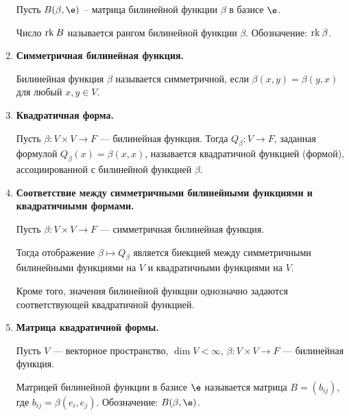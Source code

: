 \begin{enumerate}
Пусть $B(\beta, \e)$ -- матрица билинейной функции $\beta$ в базисе $\e$.

Число $\mathrm{rk}\: B$ называется рангом билинейной функции $\beta$. Обозначение: $\mathrm{rk}\: \beta$.
\item \textbf{Симметричная билинейная функция.}

Билинейная функция $\beta$ называется симметричной, если $\beta(x, y) =\beta(y, x)$ для любый $x, y \in V$.
\item \textbf{Квадратичная форма.}

Пусть $\beta \colon V\times V \rightarrow F$ --- билинейная функция. Тогда $Q_\beta \colon V \rightarrow F$, заданная формулой $Q_\beta(x) = \beta(x, x)$, называется квадратичной функцией (формой), ассоциированной с билинейной функцией $\beta$.
\item \textbf{Соответствие между симметричными билинейными функциями и квадратичными формами.}

Пусть $\beta \colon V\times V \rightarrow F$ --- симметричная билинейная функция.

Тогда отображение $\beta \mapsto Q_\beta$ является биекцией между симметричными билинейными функциями на $V$ и квадратичными функциями на $V$.

Кроме того, значения билинейной функции однозначно задаются соответствующей квадратичной функцией.
\item \textbf{Матрица квадратичной формы.}

Пусть $V$ --- векторное пространство, $\dim V < \infty$, $\beta \colon V \times V \rightarrow F$ --- билинейная функция.

Матрицей билинейной функции в базисе $\e$ называется матрица $B = (b_{ij})$, где $b_{ij} = \beta(e_i, e_j)$. Обозначение: $B(\beta, \e)$.
\end{enumerate}

